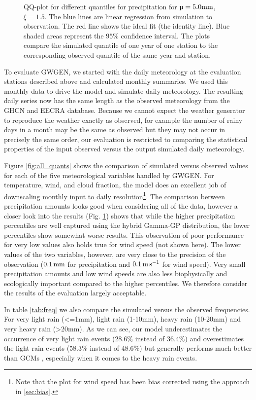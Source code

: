 \documentclass[
11pt, %
english, %
singlespacing, %
headsepline, %
]{MastersDoctoralThesis} %
\makeatletter
\DeclareRobustCommand*\unit[1]%
{\ensuremath{%
		{\thinmuskip3mu\relax
			\def\mu{\text{\textmu}}\def~{\,}%
			\ifx\f@series\testbx\mathbf{#1}\else\mathrm{#1}\fi}}}
\makeatother
\begin{document}
\begin{NoHyper}
\begin{refsection}
\begin{figure}
	\caption[QQ-plots for different quantiles for precipitation]{QQ-plot for different quantiles for precipitation for ${\mu=5.0\unit{mm}}$, $\xi=1.5$. The blue lines are linear regression from simulation to observation. The red line shows the ideal fit (the identity line). Blue shaded areas represent the $95\%$ confidence interval. The plots compare the simulated quantile of one year of one station to the corresponding observed quantile of the same year and station. }
	\label{fig:precip_quants}
\end{figure}

To evaluate GWGEN, we started with the daily meteorology at the evaluation stations described above and calculated monthly summaries. We used this monthly data to drive the model and simulate daily meteorology. The resulting daily series now has the same length as the observed meteorology from the GHCN and EECRA database. Because we cannot expect the weather generator to reproduce the weather exactly as observed, for example the number of rainy days in a month may be the same as observed but they may not occur in precisely the same order, our evaluation is restricted to comparing the statistical properties of the input observed versus the output simulated daily meteorology.

Figure \ref{fig:all_quants} shows the comparison of simulated versus observed values for each of the five meteorological variables handled by GWGEN. For temperature, wind, and cloud fraction, the model does an excellent job of downscaling monthly input to daily resolution\footnote{Note that the plot for wind speed has been bias corrected using the approach in \autoref{sec:bias}.}. The comparison between precipitation amounts looks good when considering all of the data, however a closer look into the results (Fig. \ref{fig:precip_quants}) shows that while the higher precipitation percentiles are well captured using the hybrid Gamma-GP distribution, the lower percentiles show somewhat worse results. This observation of poor performance for very low values also holds true for wind speed (not shown here). The lower values of the two variables, however, are very close to the precision of the observation ($0.1\, \unit{mm}$ for precipitation and  $0.1\, \unit{m}\, \unit{s}^{-1}$ for wind speed). Very small precipitation amounts and low wind speeds are also less biophysically and ecologically important compared to the higher percentiles. We therefore consider the results of the evaluation largely acceptable.

In table \ref{tab:freq} we also compare the simulated versus the observed frequencies. For very light rain (<=1mm), light rain (1-10mm), heavy rain (10-20mm) and very heavy rain (>20mm). As we can see, our model underestimates the occurrence of very light rain events ($28.6\%$ instead of $36.4\%$) and overestimates the light rain events ($58.3\%$ instead of $48.6\%$) but generally performs much better than GCMs \citep{Dai2006,SunSolomonDaiEtAl2006}, especially when it comes to the heavy rain events.


\end{refsection}
\end{NoHyper}
\end{document}
